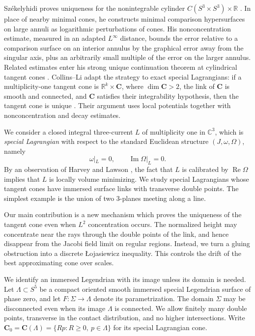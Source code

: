\documentclass[11pt,a4paper]{article}
\numberwithin{equation}{section}
\theoremstyle{definition}
\theoremstyle{remark}
\newcommand{\R}{\mathbb R}
\newcommand{\C}{\mathbb C}
\newcommand{\Ree}{\operatorname{Re}}
\begin{document}
	Sz\'ekelyhidi proves uniqueness for the nonintegrable cylinder
	$C(S^3\times S^3)\times\R$ \cite{Sze20}. In place of nearby minimal
	cones, he constructs minimal comparison hypersurfaces on large annuli
	as logarithmic perturbations of cones. His nonconcentration estimate,
	measured in an adapted $L^\infty$ distance, bounds the error relative to
	a comparison surface on an interior annulus by the graphical error away
	from the singular axis, plus an arbitrarily small multiple of the error
	on the larger annulus. Related estimates enter his strong unique
	continuation theorem at cylindrical tangent cones \cite{Sze21}.
	Collins--Li adapt the strategy to exact special
	Lagrangians: if a multiplicity-one tangent cone is
	$\R^k\times\mathbf C$, where $\dim\mathbf C>2$, the link of
	$\mathbf C$ is smooth and connected, and $\mathbf C$ satisfies their
	integrability hypothesis, then the tangent cone is unique \cite{CL}.
	Their argument uses local potentials together with nonconcentration and
	decay estimates.
	
	We consider a closed integral three-current $L$ of multiplicity one in
	$\C^3$, which is \emph{special Lagrangian} with respect to the standard Euclidean structure
	$(J,\omega,\Omega)$, namely
	\[
	\omega|_L=0,\qquad \operatorname{Im}\Omega|_L=0.
	\]
	By an observation of Harvey and Lawson
	\cite[Theorem~II.4.2]{HL}, the fact that $L$ is calibrated by
	$\Ree\Omega$ implies that $L$ is locally volume minimizing.
	We study special Lagrangians whose
	tangent cones have immersed surface links with transverse double points.
	The simplest example is the union of two 3-planes meeting along a line.
	
	Our main contribution is a new mechanism which proves the uniqueness of the
	tangent cone even when $L^2$ concentration occurs. The normalized height
	may concentrate near the rays through the double points of the link,
	and hence disappear from the Jacobi field limit on regular regions.
	Instead, we turn a gluing obstruction into a discrete \L{}ojasiewicz inequality.
	This controls the drift of the best approximating cone over scales.
	
	We identify an immersed Legendrian with its image unless its domain is
	needed. Let $\Lambda\subset S^5$ be a compact oriented
	smooth immersed special Legendrian surface of phase zero, and let
	$F:\Sigma\to\Lambda$ denote its parametrization. The domain $\Sigma$
	may be disconnected even when its image $\Lambda$ is connected. We allow
	finitely many double points,
	transverse in the contact distribution, and no higher intersections.
	Write $\mathbf C_0=\mathbf C(\Lambda)=\{Rp:R\ge0,\ p\in\Lambda\}$
	for its special Lagrangian cone.
	
\end{document}
